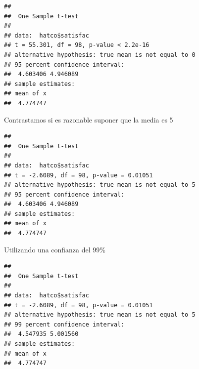 \documentclass[]{book}
\newenvironment{Shaded}{\begin{snugshade}}{\end{snugshade}}
\newcommand{\CommentTok}[1]{\textcolor[rgb]{0.56,0.35,0.01}{\textit{#1}}}
\newcommand{\DataTypeTok}[1]{\textcolor[rgb]{0.13,0.29,0.53}{#1}}
\newcommand{\DecValTok}[1]{\textcolor[rgb]{0.00,0.00,0.81}{#1}}
\newcommand{\FloatTok}[1]{\textcolor[rgb]{0.00,0.00,0.81}{#1}}
\newcommand{\KeywordTok}[1]{\textcolor[rgb]{0.13,0.29,0.53}{\textbf{#1}}}
\newcommand{\NormalTok}[1]{#1}
\newcommand{\OperatorTok}[1]{\textcolor[rgb]{0.81,0.36,0.00}{\textbf{#1}}}
\begin{document}
\begin{Shaded}
\end{Shaded}

\begin{verbatim}
## 
##  One Sample t-test
## 
## data:  hatco$satisfac
## t = 55.301, df = 98, p-value < 2.2e-16
## alternative hypothesis: true mean is not equal to 0
## 95 percent confidence interval:
##  4.603406 4.946089
## sample estimates:
## mean of x 
##  4.774747
\end{verbatim}

Contrastamos si es razonable suponer que la media es 5

\begin{Shaded}
\end{Shaded}

\begin{verbatim}
## 
##  One Sample t-test
## 
## data:  hatco$satisfac
## t = -2.6089, df = 98, p-value = 0.01051
## alternative hypothesis: true mean is not equal to 5
## 95 percent confidence interval:
##  4.603406 4.946089
## sample estimates:
## mean of x 
##  4.774747
\end{verbatim}

Utilizando una confianza del 99\%

\begin{Shaded}
\end{Shaded}

\begin{verbatim}
## 
##  One Sample t-test
## 
## data:  hatco$satisfac
## t = -2.6089, df = 98, p-value = 0.01051
## alternative hypothesis: true mean is not equal to 5
## 99 percent confidence interval:
##  4.547935 5.001560
## sample estimates:
## mean of x 
##  4.774747
\end{verbatim}
\end{document}
